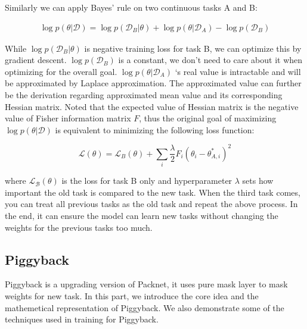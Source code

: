 Similarly we can apply Bayes' rule on two continuous tasks A and B: 

\begin{equation}
\begin{aligned}
\log p(\theta | \mathcal{D})=\log p\left(\mathcal{D}_{B} | \theta\right)+\log p\left(\theta | \mathcal{D}_{A}\right)-\log p\left(\mathcal{D}_{B}\right)
\end{aligned}
\end{equation}

While $\log p(\mathcal{D}_{B}|\theta)$ is negative training loss for task B, we can optimize this by gradient descent.
$\log p(\mathcal{D}_{B})$ is a constant, we don't need to care about it when optimizing for the overall goal. $\log p(\theta|\mathcal{D}_{A})$ ‘s real value is intractable and will be approximated by Laplace approximation. The approximated value can further be the derivation regarding approximated mean value and its corresponding Hessian matrix. Noted that the expected value of Hessian matrix is the negative value of Fisher information matrix $F$, thus the original goal of maximizing $\log p(\theta | \mathcal{D})$ is equivalent to minimizing the following loss function:

\begin{equation}
\mathcal{L}(\theta)=\mathcal{L}_{B}(\theta)+\sum_{i} \frac{\lambda}{2} F_{i}\left(\theta_{i}-\theta_{A, i}^{*}\right)^{2}
\end{equation}

where $\mathcal{L}_{\mathcal{B}}(\theta)$ is the loss for task B only and hyperparameter $\lambda$ sets how important the old task is compared to the new task. When the third task comes, you can treat all previous tasks as the old task and repeat the above process. In the end, it can ensure the model can learn new tasks without changing the weights for the previous tasks too much. 





\subsection{Piggyback}
Piggyback is a upgrading version of Packnet, it uses pure mask layer to mask weights for new task. In this part, we introduce the core idea and the mathemetical representation of Piggyback. We also demonstrate some of the techniques used in training for Piggyback.

